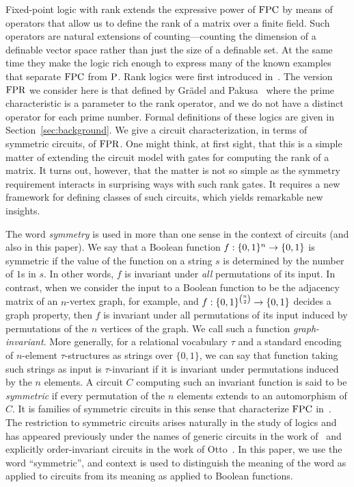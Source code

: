 \documentclass[a4paper,UKenglish]{lipics-v2018}
\begin{document}
Fixed-point logic with rank extends the expressive power of $\text{\upshape FPC}$ by means of
operators that allow us to define the rank of a matrix over a finite field. Such
operators are natural extensions of counting---counting the dimension of a
definable vector space rather than just the size of a definable set. At the same
time they make the logic rich enough to express many of the known examples that
separate $\text{\upshape FPC}$ from $\mathrm{P}$. Rank logics were first introduced
in~\cite{Dawar09logicswith}. The version $\text{\upshape FPR}$ we consider here is that defined
by Gr\"adel and Pakusa~\cite{GradelP15a} where the prime characteristic is a
parameter to the rank operator, and we do not have a distinct operator for each
prime number. Formal definitions of these logics are given in
Section~\ref{sec:background}. We give a circuit characterization, in terms of
symmetric circuits, of $\text{\upshape FPR}$. One might think, at first sight, that this is a
simple matter of extending the circuit model with gates for computing the rank
of a matrix. It turns out, however, that the matter is not so simple as the
symmetry requirement interacts in surprising ways with such rank gates. It
requires a new framework for defining classes of such circuits, which yields
remarkable new insights.

The word \emph{symmetry} is used in more than one sense in the context of
circuits (and also in this paper). We say that a Boolean function $f:\{0,1\}^n
\rightarrow \{0,1\}$ is symmetric if the value of the function on a string $s$ is
determined by the number of $1$s in $s$. In other words, $f$ is invariant under
\emph{all} permutations of its input. In contrast, when we consider the input to
a Boolean function to be the adjacency matrix of an $n$-vertex graph, for
example, and $f : \{0,1\}^{n \choose 2} \rightarrow \{0,1\}$ decides a graph property,
then $f$ is invariant under all permutations of its input induced by
permutations of the $n$ vertices of the graph. We call such a function
\emph{graph-invariant}. More generally, for a relational vocabulary $\tau$ and a
standard encoding of $n$-element $\tau$-structures as strings over $\{0,1\}$, we
can say that function taking such strings as input is $\tau$-invariant if it is
invariant under permutations induced by the $n$ elements. A circuit $C$
computing such an invariant function is said to be \emph{symmetric} if every
permutation of the $n$ elements extends to an automorphism of $C$. It is
families of symmetric circuits in this sense that characterize $\text{\upshape FPC}$
in~\cite{AndersonD17}. The restriction to symmetric circuits arises naturally in
the study of logics and has appeared previously under the names of generic
circuits in the work of~\cite{DENENBERG1986216} and explicitly order-invariant
circuits in the work of Otto~\cite{Otto1997}. In this paper, we use the word
``symmetric'', and context is used to distinguish the meaning of the word as
applied to circuits from its meaning as applied to Boolean functions.
\end{document}
